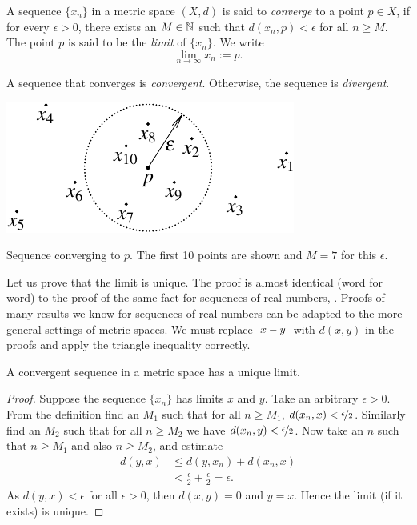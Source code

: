 \begin{defn}
A sequence $\{ x_n \}$ in a metric space $(X,d)$ is said
to \emph{converge} to a point
$p \in X$, if for every $\epsilon > 0$, there exists an $M \in {\mathbb{N}}$ such
that $d(x_n,p) < \epsilon$ for all $n \geq M$.  The point $p$
is said to be the \emph{limit}
of $\{ x_n \}$.  We write
\begin{equation*}
\lim_{n\to \infty} x_n := p .
\end{equation*}

A sequence
that converges is \emph{convergent}.
Otherwise, the sequence is 
\emph{divergent}.
\begin{myfigureht}
\includegraphics{figures/sequence-convergence-metric}
\caption{Sequence converging to $p$.  The first 10 points 
are shown and $M=7$ for this $\epsilon$.\label{fig:sequence-convergence-metric}}
\end{myfigureht}
\end{defn}

Let us prove that the limit is unique.  The proof is almost
identical (word for word) to the proof of the same fact for sequences of
real numbers,
.
Proofs of many results we know for sequences of real numbers can be
adapted to
the more general settings of metric spaces.  We must replace $\left\lvert {x-y} \right\rvert$
with $d(x,y)$ in the proofs and apply the triangle inequality correctly.

\begin{prop} \label{prop:mslimisunique}
A convergent sequence in a metric space has a unique limit.
\end{prop}

\begin{proof}
Suppose the sequence $\{ x_n \}$ has limits $x$ and $y$.
Take an arbitrary $\epsilon > 0$.
From the definition find an $M_1$ such that for all $n \geq M_1$,
$d(x_n,x) < \nicefrac{\epsilon}{2}$.  Similarly find an $M_2$
such that for all $n \geq M_2$ we have
$d(x_n,y) < \nicefrac{\epsilon}{2}$.  Now take an $n$ such that
$n \geq M_1$ and also $n \geq M_2$, and estimate
\begin{equation*}
\begin{split}
d(y,x)
& \leq
d(y,x_n) + d(x_n,x) \\
& <
\frac{\epsilon}{2} + \frac{\epsilon}{2} = \epsilon .
\end{split}
\end{equation*}
As $d(y,x) < \epsilon$ for all $\epsilon > 0$, then $d(x,y) = 0$
and $y=x$.  Hence the limit (if it exists) is unique.
\end{proof}

